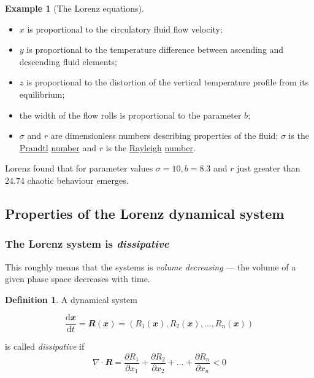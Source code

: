 \documentclass[
  a4paper,
  oneside,
  final]{krantz}
\providecommand{\tightlist}{%
  \setlength{\itemsep}{0pt}\setlength{\parskip}{0pt}}
\renewcommand{\d}{\mathrm{d}}
\renewcommand{\v}[1]{{\mathbfit{#1}}}
\newcommand{\pder}[2]{\dfrac{\partial #1}{\partial#2}}
\newcommand{\der}[2]{\dfrac{\d #1}{\d #2}}
\theoremstyle{definition}
\newtheorem{definition}{Definition}[chapter]
\theoremstyle{definition}
\newtheorem{example}{Example}[chapter]
\theoremstyle{definition}
\theoremstyle{definition}
\theoremstyle{remark}
\begin{document}
\begin{example}[The Lorenz equations]
\begin{itemize}
\tightlist
\item
  \(x\) is proportional to the circulatory fluid flow velocity;
\item
  \(y\) is proportional to the temperature difference between ascending and descending fluid elements;
\item
  \(z\) is proportional to the distortion of the vertical temperature profile from its equilibrium;
\item
  the width of the flow rolls is proportional to the parameter \(b\);
\item
  \(\sigma\) and \(r\) are dimensionless numbers describing properties of the fluid; \(\sigma\) is the \href{https://mathshistory.st-andrews.ac.uk/Biographies/Prandtl/}{Prandtl} \href{https://en.wikipedia.org/wiki/Prandtl_number}{number} and \(r\) is the \href{https://mathshistory.st-andrews.ac.uk/Biographies/Rayleigh/}{Rayleigh} \href{https://en.wikipedia.org/wiki/Rayleigh_number}{number}.
\end{itemize}

Lorenz found that for parameter values \(\sigma = 10, b= 8.3\) and \(r\) just greater than \(24.74\) chaotic behaviour emerges.
\end{example}

\hypertarget{properties-of-the-lorenz-dynamical-system}{%
\subsection{Properties of the Lorenz dynamical system}\label{properties-of-the-lorenz-dynamical-system}}

\hypertarget{the-lorenz-system-is-dissipative}{%
\subsubsection*{\texorpdfstring{The Lorenz system is \emph{dissipative}}{The Lorenz system is dissipative}}\label{the-lorenz-system-is-dissipative}}


This roughly means that the systems is \emph{volume decreasing} --- the volume of a given phase space decreases with time.

\begin{definition}
\protect\hypertarget{def:dissipative}{}\label{def:dissipative}A dynamical system

\[ \der{\v{x}}{t} = \v{R}(\v{x}) = (R_{1}(\v{x}), R_2(\v{x}), \ldots, R_{n}(\v{x}))\]

is called \emph{dissipative} if \[\nabla \cdot \v{R} = \pder{R_1}{x_1} + \pder{R_2}{x_2} + \ldots + \pder{R_n}{x_n} <0\]
\end{definition}
\end{document}
